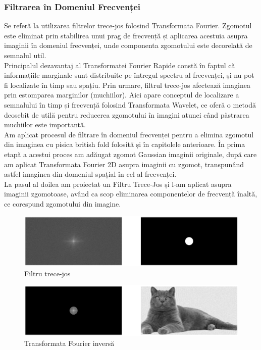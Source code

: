 \documentclass[12pt]{article}
\begin{document}
\subsubsection{Filtrarea în Domeniul Frecvenței}
Se referă la utilizarea filtrelor trece-jos folosind Transformata Fourier. Zgomotul este eliminat prin stabilirea unui prag de frecvență și aplicarea acestuia asupra imaginii în domeniul frecvenței, unde componenta zgomotului este decorelată de semnalul util.\\
\indent Principalul dezavantaj al Transformatei Fourier Rapide constă în faptul că informațiile marginale sunt distribuite pe întregul spectru al frecvenței, și nu pot fi localizate în timp sau spațiu. Prin urmare, filtrul trece-jos afectează imaginea prin estomparea marginilor (muchiilor). Aici apare conceptul de localizare a semnalului în timp și frecvență folosind Transformata Wavelet, ce oferă o metodă deosebit de utilă pentru reducerea zgomotului în imagini atunci când păstrarea muchiilor este importantă. \\

\indent Am aplicat procesul de filtrare în domeniul frecvenței pentru a elimina zgomotul din imaginea cu pisica british fold folosită și în capitolele anterioare. În prima etapă a acestui proces am adăugat zgomot Gaussian imaginii originale, după care am aplicat Transformata Fourier 2D asupra imaginii cu zgomot, transpunând astfel imaginea din domeniul spațial în cel al frecvenței. \\
\indent La pasul al doilea am proiectat un Filtru Trece-Jos și l-am aplicat asupra imaginii zgomotoase, având ca scop eliminarea componentelor de frecvență înaltă, ce corespund zgomotului din imagine.

\begin{figure}[h!]
    \centering
    \includegraphics[width=1\textwidth]{images/low_pass_filter.eps}
    \caption{Filtru trece-jos}
    \label{fig:low_pass_filter}
\end{figure}

\begin{figure}[h!]
    \centering
    \includegraphics[width=1\textwidth]{images/inverse_fourier_transform.eps}
    \caption{Transformata Fourier inversă}
    \label{fig:inverse_fourier_transform}
\end{figure} \newpage
\end{document}
